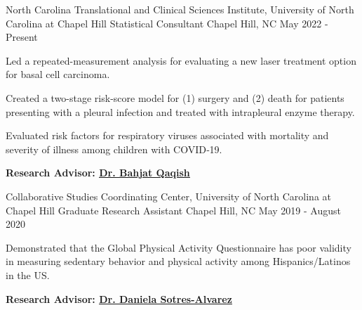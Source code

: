\begin{cventries}
  
  \cventry
    {North Carolina Translational and Clinical Sciences Institute, University of North Carolina at Chapel Hill} %
    {Statistical Consultant} %
    {Chapel Hill, NC} %
    {May 2022 - Present} %
    {
      \begin{cvitems} %
      \item Led a repeated-measurement analysis for evaluating a new laser treatment option for basal cell carcinoma. 
      \item Created a two-stage risk-score model for (1) surgery and (2) death for patients presenting with a pleural infection \newline and treated with intrapleural enzyme therapy. 
      \item Evaluated risk factors for respiratory viruses associated with mortality and severity of illness among children with COVID‑19.
        \item  \textbf{Research Advisor:
\href{https://sph.unc.edu/adv_profile/bahjat-qaqish-phd/}{\underline{Dr. Bahjat Qaqish}}
}
      \end{cvitems}
    }
    
\cventry
{Collaborative Studies Coordinating Center, University of North Carolina at Chapel Hill} %
{Graduate Research Assistant} %
{Chapel Hill, NC} %
{May 2019 - August 2020} %
{
  \begin{cvitems} %
\item  Demonstrated that the Global Physical Activity Questionnaire has poor validity in measuring sedentary behavior \newline and physical activity  among Hispanics/Latinos in the US.
\item \textbf{Research Advisor: 
\href{https://sph.unc.edu/adv_profile/daniela-sotres-alvarez-drph/}{\underline{Dr. Daniela Sotres-Alvarez}}
}
  \end{cvitems}
}



\end{cventries}
